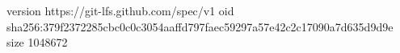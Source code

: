 version https://git-lfs.github.com/spec/v1
oid sha256:379f2372285cbc0c0c3054aaffd797faec59297a57e42c2c17090a7d635d9d9e
size 1048672
